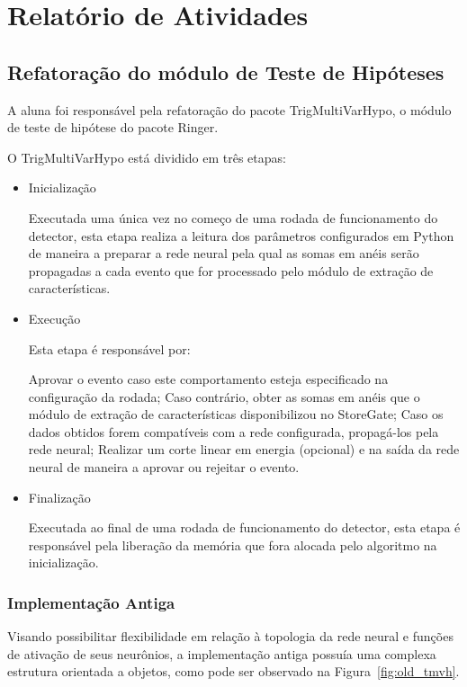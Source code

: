 \documentclass[a4paper,10pt,titlepage]{article}
\begin{document}
\section{Relatório de Atividades}

\subsection{Refatoração do módulo de Teste de Hipóteses}

A aluna foi responsável pela refatoração do pacote TrigMultiVarHypo, o módulo de teste de hipótese do pacote Ringer.

O TrigMultiVarHypo está dividido em três etapas:

\begin{itemize}
 \item Inicialização

Executada uma única vez no começo de uma rodada de funcionamento do detector, esta etapa realiza a leitura dos parâmetros configurados em Python de maneira a preparar a rede neural pela qual as somas em anéis serão propagadas a cada evento que for processado pelo módulo de extração de características.

 \item Execução

Esta etapa é responsável por:

 \subitem Aprovar o evento caso este comportamento esteja especificado na configuração da rodada; 
 \subitem Caso contrário, obter as somas em anéis que o módulo de extração de características disponibilizou no StoreGate;
 \subitem Caso os dados obtidos forem compatíveis com a rede configurada, propagá-los pela rede neural;
 \subitem Realizar um corte linear em energia (opcional) e na saída da rede neural de maneira a aprovar ou rejeitar o evento.

 \item Finalização

Executada ao final de uma rodada de funcionamento do detector, esta etapa é responsável pela liberação da memória que fora alocada pelo algoritmo na inicialização.

\end{itemize}

\subsubsection{Implementação Antiga}

Visando possibilitar flexibilidade em relação à topologia da rede neural e funções de ativação de seus neurônios, a implementação antiga possuía uma complexa estrutura orientada a objetos, como pode ser observado na Figura~\ref{fig:old_tmvh}.
\end{document}
